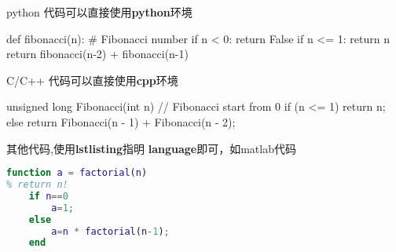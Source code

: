 \label{sec:method:code}

python 代码可以直接使用\textbf{python}环境

\begin{python}[caption={斐波那契Python}]
def fibonacci(n):
    # Fibonacci number
    if n < 0:
        return False
    if n <= 1:
        return n
    return fibonacci(n-2) + fibonacci(n-1)
\end{python}

C/C++ 代码可以直接使用\textbf{cpp}环境

\begin{cpp}[caption={斐波那契C++}]
unsigned long Fibonacci(int n)
{
    // Fibonacci start from 0
    if (n <= 1) 
    {
        return n;
    }
    else 
    {
        return Fibonacci(n - 1) + Fibonacci(n - 2);
    }
}
\end{cpp}

其他代码,使用\textbf{lstlisting}指明 \textbf{language}即可，如matlab代码

\begin{lstlisting}[caption={Matlab代码},language=Matlab]
function a = factorial(n)
% return n!
    if n==0
        a=1;
    else
        a=n * factorial(n-1);
    end
\end{lstlisting}